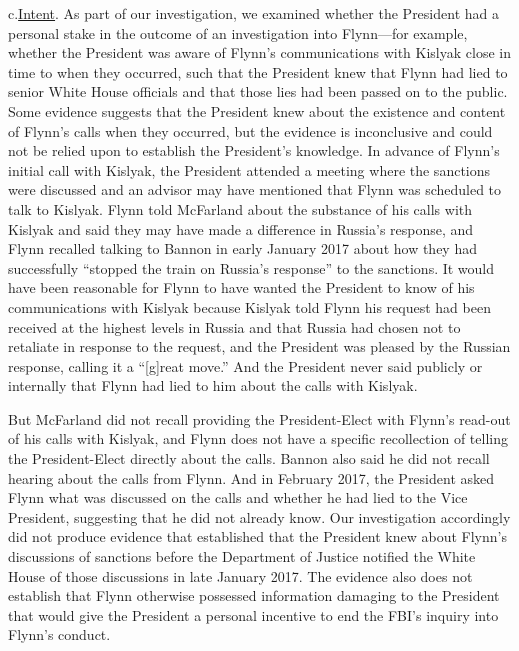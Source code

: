 c.\qquad\underline{Intent}.
As part of our investigation, we examined whether the President had a personal stake in the outcome of an investigation into Flynn---for example, whether the President was aware of Flynn's communications with Kislyak close in time to when they occurred, such that the President knew that Flynn had lied to senior White House officials and that those lies had been passed on to the public.
Some evidence suggests that the President knew about the existence and content of Flynn's calls when they occurred, but the evidence is inconclusive and could not be relied upon to establish the President's knowledge.
In advance of Flynn's initial call with Kislyak, the President attended a meeting where the sanctions were discussed and an advisor may have mentioned that Flynn was scheduled to talk to Kislyak.
Flynn told McFarland about the substance of his calls with Kislyak and said they may have made a difference in Russia's response, and Flynn recalled talking to Bannon in early January 2017 about how they had successfully ``stopped the train on Russia's response'' to the sanctions.
It would have been reasonable for Flynn to have wanted the President to know of his communications with Kislyak because Kislyak told Flynn his request had been received at the highest levels in Russia and that Russia had chosen not to retaliate in response to the request, and the President was pleased by the Russian response, calling it a ``[g]reat move.''
And the President never said publicly or internally that Flynn had lied to him about the calls with Kislyak.

But McFarland did not recall providing the President-Elect with Flynn's read-out of his calls with Kislyak, and Flynn does not have a specific recollection of telling the President-Elect directly about the calls.
Bannon also said he did not recall hearing about the calls from Flynn.
And in February 2017, the President asked Flynn what was discussed on the calls and whether he had lied to the Vice President, suggesting that he did not already know.
Our investigation accordingly did not produce evidence that established that the President knew about Flynn's discussions of sanctions before the Department of Justice notified the White House of those discussions in late January 2017.
The evidence also does not establish that Flynn otherwise possessed information damaging to the President that would give the President a personal incentive to end the FBI's inquiry into Flynn's conduct.

